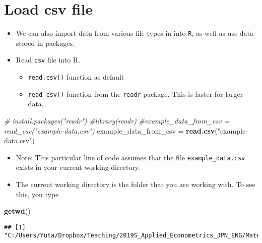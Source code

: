 \documentclass[]{book}
\newenvironment{Shaded}{\begin{snugshade}}{\end{snugshade}}
\newcommand{\CommentTok}[1]{\textcolor[rgb]{0.56,0.35,0.01}{\textit{#1}}}
\newcommand{\KeywordTok}[1]{\textcolor[rgb]{0.13,0.29,0.53}{\textbf{#1}}}
\newcommand{\NormalTok}[1]{#1}
\newcommand{\StringTok}[1]{\textcolor[rgb]{0.31,0.60,0.02}{#1}}
\providecommand{\tightlist}{%
  \setlength{\itemsep}{0pt}\setlength{\parskip}{0pt}}
\begin{document}
\hypertarget{load-csv-file}{%
\section{Load csv file}\label{load-csv-file}}

\begin{itemize}
\tightlist
\item
  We can also import data from various file types in into \texttt{R}, as well as use data stored in packages.
\item
  Read \texttt{csv} file into R.

  \begin{itemize}
  \tightlist
  \item
    \texttt{read.csv()} function as default
  \item
    \texttt{read\_csv()} function from the \texttt{readr} package. This is faster for larger data.
  \end{itemize}
\end{itemize}

\begin{Shaded}
\begin{Highlighting}[]
\CommentTok{# install.packages("readr") }
\CommentTok{#library(readr)}
\CommentTok{#example_data_from_csv = read_csv("example-data.csv")}
\NormalTok{example_data_from_csv =}\StringTok{ }\KeywordTok{read.csv}\NormalTok{(}\StringTok{"example-data.csv"}\NormalTok{)}
\end{Highlighting}
\end{Shaded}

\begin{itemize}
\tightlist
\item
  Note: This particular line of code assumes that the file \texttt{example\_data.csv} exists in your current working directory.
\item
  The current working directory is the folder that you are working with. To see this, you type
\end{itemize}

\begin{Shaded}
\begin{Highlighting}[]
\KeywordTok{getwd}\NormalTok{()}
\end{Highlighting}
\end{Shaded}

\begin{verbatim}
## [1] "C:/Users/Yuta/Dropbox/Teaching/2019S_Applied_Econometrics_JPN_ENG/Material_Github"
\end{verbatim}
\end{document}
